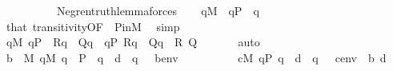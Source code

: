 \begin{isabellebody}
\ \ \ \ \ \ \ \ \ \ Neg{\isacharparenleft}{\kern0pt}ren{\isacharunderscore}{\kern0pt}truth{\isacharunderscore}{\kern0pt}lemma{\isacharparenleft}{\kern0pt}forces{\isacharparenleft}{\kern0pt}{\isasymphi}{\isacharparenright}{\kern0pt}{\isacharparenright}{\kern0pt}{\isacharparenright}{\kern0pt}{\isacharparenright}{\kern0pt}{\isacharparenright}{\kern0pt}{\isacharparenright}{\kern0pt}{\isachardoublequoteclose}\isanewline
\ \ \isamarkupfalse%
\ {\isachardoublequoteopen}q{\isasymin}M{\isachardoublequoteclose}\ \ {\isachardoublequoteopen}q{\isasymin}P{\isachardoublequoteclose}\ \ q\ \isamarkupfalse%
\ that\ transitivity{\isacharbrackleft}{\kern0pt}OF\ {\isacharunderscore}{\kern0pt}\ P{\isacharunderscore}{\kern0pt}in{\isacharunderscore}{\kern0pt}M{\isacharbrackright}{\kern0pt}\ \isamarkupfalse%
\ simp\isanewline
\ \ \isamarkupfalse%
\isanewline
\ \ \isamarkupfalse%
\ {}{\isacharcolon}{\kern0pt}{\isachardoublequoteopen}{\isasymforall}q{\isasymin}M{\isachardot}{\kern0pt}\ q{\isasymin}P\ {\isasymand}\ R{\isacharparenleft}{\kern0pt}q{\isacharparenright}{\kern0pt}\ {\isasymlongrightarrow}\ Q{\isacharparenleft}{\kern0pt}q{\isacharparenright}{\kern0pt}\ {\isasymLongrightarrow}\ {\isacharparenleft}{\kern0pt}{\isasymforall}q{\isasymin}P{\isachardot}{\kern0pt}\ R{\isacharparenleft}{\kern0pt}q{\isacharparenright}{\kern0pt}\ {\isasymlongrightarrow}\ Q{\isacharparenleft}{\kern0pt}q{\isacharparenright}{\kern0pt}{\isacharparenright}{\kern0pt}{\isachardoublequoteclose}\ \ R\ Q\ \isanewline
\ \ \ \ \isamarkupfalse%
\ auto\isanewline
\ \ \isamarkupfalse%
\isanewline
\ \ \isamarkupfalse%
\ {\isachardoublequoteopen}{\isasymlbrakk}b\ {\isasymin}\ M{\isacharsemicolon}{\kern0pt}\ {\isasymforall}q{\isasymin}M{\isachardot}{\kern0pt}\ q\ {\isasymin}\ P\ {\isasymand}\ q\ {\isasympreceq}\ d\ {\isasymlongrightarrow}\ {\isasymnot}{\isacharparenleft}{\kern0pt}q\ {\isasymtturnstile}\ {\isasymphi}\ {\isacharparenleft}{\kern0pt}{\isacharbrackleft}{\kern0pt}b{\isacharbrackright}{\kern0pt}{\isacharat}{\kern0pt}env{\isacharparenright}{\kern0pt}{\isacharparenright}{\kern0pt}{\isasymrbrakk}\ {\isasymLongrightarrow}\isanewline
\ \ \ \ \ \ \ \ \ {\isasymexists}c{\isasymin}M{\isachardot}{\kern0pt}\ {\isasymforall}q{\isasymin}P{\isachardot}{\kern0pt}\ q\ {\isasympreceq}\ d\ {\isasymlongrightarrow}\ {\isasymnot}{\isacharparenleft}{\kern0pt}q\ {\isasymtturnstile}\ {\isasymphi}\ {\isacharparenleft}{\kern0pt}{\isacharbrackleft}{\kern0pt}c{\isacharbrackright}{\kern0pt}{\isacharat}{\kern0pt}env{\isacharparenright}{\kern0pt}{\isacharparenright}{\kern0pt}{\isachardoublequoteclose}\ \ b\ d\isanewline

\end{isabellebody}
